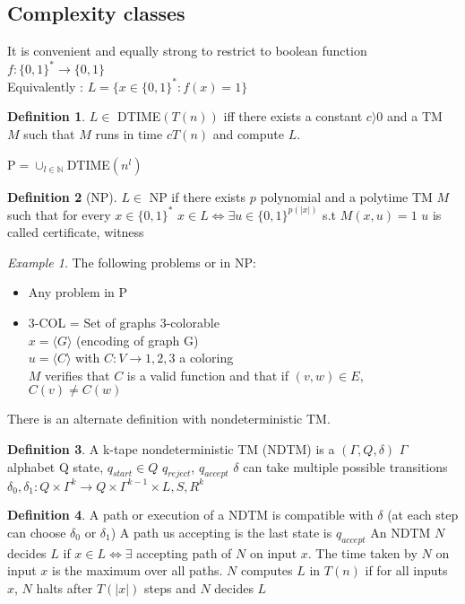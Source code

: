 \documentclass{article}
\theoremstyle{definition}
\newtheorem{definition}{Definition}
\theoremstyle{remark}
\newtheorem*{example}{Example}
\begin{document}
\subsection{Complexity classes}
It is convenient and equally strong to restrict to boolean function ${f:\{0,1\}^*\rightarrow\{0,1\}}$\\
Equivalently : $L = \{x \in \{0,1\}^* : f(x)=1\}$

\begin{definition}
	$L \in$ DTIME$(T(n))$ iff there exists a constant $c \rangle 0$ and a TM $M$ such that $M$ runs in time $cT(n)$ and compute $L$.
	
	P$ = \cup_{l \in \mathbb{N}} $DTIME$(n^l)$

\end{definition}

\begin{definition}[NP]
	$L \in$ NP if there exists $p$ polynomial and a polytime TM $M$ such that for every $x\in\{0,1\}^*$
		$x \in L \Leftrightarrow \exists u \in \{0,1\}^{p(|x|)}$ s.t $M(x,u) = 1$
		$u$ is called certificate, witness
\end{definition}

\begin{example}
	The following problems or in NP:
	\begin{itemize}
		\item Any problem in P
		\item 3-COL = Set of graphs 3-colorable\\
		$x = \langle G\rangle$ (encoding of graph G)\\
		$u = \langle C\rangle$ with $C:V\rightarrow{1,2,3}$ a coloring\\
		$M$ verifies that $C$ is a valid function and that if $(v,w) \in E$, $C(v) \neq C(w)$
	\end{itemize}
\end{example}
There is an alternate definition with nondeterministic TM.
\begin{definition}
	A k-tape nondeterministic TM (NDTM) is a $(\Gamma,Q,\delta)$
	$\Gamma$ alphabet
	Q state, $q_{start} \in Q$
	$q_{reject}$, $q_{accept}$
	$\delta$ can take multiple possible transitions
		$\delta_0, \delta_1 : Q\times\Gamma^k \rightarrow Q\times\Gamma^{k-1}\times{L,S,R}^k$
\end{definition}

\begin{definition}
	A path or execution of a NDTM is compatible with $\delta$ (at each step can choose $\delta_0$ or $\delta_1$)
	A path us accepting is the last state is $q_{accept}$
	An NDTM $N$ decides $L$ if $x\in L \Leftrightarrow \exists$ accepting path of $N$ on input $x$.
	The time taken by $N$ on input $x$ is the maximum over all paths.
	$N$ computes $L$ in $T(n)$ if for all inputs $x$, $N$ halts after $T(|x|)$ steps and $N$ decides $L$
\end{definition}
\end{document}
